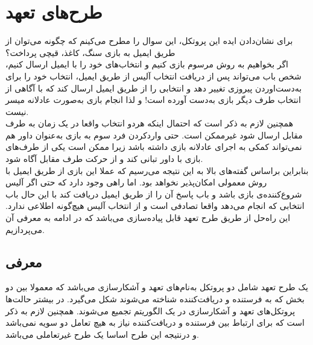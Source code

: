 \section{ طرح‌های تعهد}\label{commitment_schemes}


برای نشان‌دادن ایده این پروتکل، این سوال را مطرح می‌کینم  که چگونه می‌توان از طریق ایمیل به بازی سنگ، کاغذ، قیچی پرداخت؟ 
\\
اگر بخواهیم به روش مرسوم بازی کنیم و انتخاب‌های خود را با ایمیل ارسال کنیم، شخص باب می‌تواند پس از دریافت انتخاب آلیس از طریق ایمیل، انتخاب خود را برای به‌دست‌اوردن پیروزی تغییر دهد و انتخابی را از طریق ایمیل ارسال کند که با آگاهی از انتخاب طرف دیگر بازی  به‌دست آورده است! و لذا انجام بازی  به‌صورت  عادلانه میسر نیست.
\\
همچنین لازم به ذکر است که احتمال اینکه هردو انتخاب واقعا در یک زمان به طرف مقابل ارسال شود غیرممکن است. حتی واردکردن فرد سوم به بازی به‌عنوان داور هم نمی‌تواند کمکی به اجرای عادلانه بازی داشته باشد زیرا ممکن است یکی از طرف‌های بازی با داور تبانی کند و از حرکت طرف مقابل آگاه شود.
\\
 بنابراین براساس گفته‌های بالا  به این نتیجه می‌رسیم که عملا این بازی از طریق ایمیل با روش معمولی امکان‌پذیر نخواهد بود.
اما راهی وجود دارد که حتی اگر آلیس شروع‌کننده‌ی بازی باشد و باب پاسخ آن را از طریق ایمیل دریافت کند با این حال باب انتخابی که انجام می‌دهد واقعا تصادفی است و از انتخاب آلیس هیچ‌گونه اطلاعی ندارد. این راه‌حل از طریق طرح تعهد قابل پیاده‌سازی می‌باشد که در ادامه به معرفی آن می‌پردازیم.

\subsection{معرفی}\label{commitment_definition}
یک طرح تعهد شامل دو پروتکل به‌نام‌های تعهد و آشکارسازی می‌باشد که معمولا بین دو بخش که به فرستنده و دریافت‌کننده شناخته می‌شوند شکل می‌گیرد. در بیشتر حالت‌ها پروتکل‌های تعهد و آشکارسازی در یک الگوریتم تجمیع ‌می‌شوند. همچنین لازم به ذکر است که برای ارتباط بین فرستنده و دریافت‌کننده نیاز به هیچ تعامل دو سویه نمی‌باشد و درنتیجه این طرح اساسا یک طرح غیرتعاملی می‌باشد.

